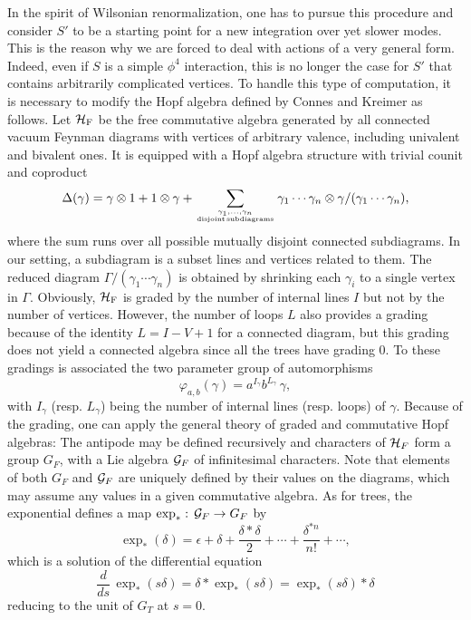 \documentclass[10pt,here,feynmf]{article}
\begin{document}
In the spirit of Wilsonian renormalization, one has to pursue this procedure and consider $S'$ to be a starting point for a new integration over yet slower modes. This is the reason why we are forced to deal with actions of a very general form. Indeed, even if $S$ is a simple $\phi^{4}$ interaction, this is no longer the case for $S'$ that contains arbitrarily complicated vertices. To handle this type of computation, it is necessary to modify the Hopf algebra defined by Connes and Kreimer as follows. Let ${\cal H}_{\mathrm{F}}$ be the free commutative algebra generated by all connected vacuum Feynman diagrams with vertices of arbitrary valence, including univalent and bivalent ones.  It is equipped with a Hopf algebra structure with trivial counit and coproduct
\begin{equation}
\Delta(\gamma)=\gamma\otimes 1+1\otimes\gamma+
\mathop{\sum}\limits_{\gamma_{1},\dots,\gamma_{n}\atop
\mathrm{disjoint\,subdiagrams}}
\gamma_{1}\cdots\gamma_{n}\otimes\gamma/(\gamma_{1}\cdots\gamma_{n}),
\label{coproductfeyn}
\end{equation}
where the sum runs over all possible mutually disjoint connected subdiagrams. In our setting, a subdiagram is a subset lines and vertices related to them. The reduced diagram $\Gamma/(\gamma_{1}\cdots\gamma_{n})$ is obtained by shrinking each $\gamma_{i}$ to a single vertex in $\Gamma$. Obviously, ${\cal H}_{\mathrm{F}}$ is graded by the number of internal lines $I$ but not by the number of vertices. However, the number of loops $L$ also provides a grading because of the identity $L=I-V+1$ for a connected diagram, but this grading does not yield a connected algebra since all the trees have grading 0. To these gradings is associated the two parameter group of automorphisms
\begin{equation}
\varphi_{a,b}(\gamma)=a^{I_{\gamma}}b^{L_{\gamma}}\,\gamma,\label{auto}
\end{equation}
with $I_{\gamma}$ (resp. $L_{\gamma}$) being the number of internal lines (resp. loops) of $\gamma$. Because of the grading, one can apply the general theory of graded and commutative Hopf algebras: The antipode may be defined recursively and characters of ${\cal H}_{F}$  form a group $G_{F}$, with a Lie algebra ${\cal G}_{F}$ of infinitesimal characters. Note that elements of both $G_{F}$ and ${\cal G}_{F}$ are uniquely defined by their values on the diagrams, which may assume any values in a given commutative algebra. As for trees, the exponential defines a map $\exp_{\ast}:\,{\cal G}_{F}\rightarrow G_{F}$ by
\begin{equation}
\exp_{\ast}(\delta)=\epsilon+\delta+\frac{\delta\ast\delta}{2}+\cdots+
\frac{\delta^{\ast n}}{n!}+\cdots,
\end{equation}
which is a solution of the differential equation
\begin{equation}
\frac{d}{ds}\,\exp_{\ast}(s\delta)=\delta\ast \exp_{\ast}(s\delta)=\exp_{\ast}(s\delta)\ast\delta
\label{diffFeyn}
\end{equation}
reducing to the unit of $G_{T}$ at $s=0$.
\end{document}
